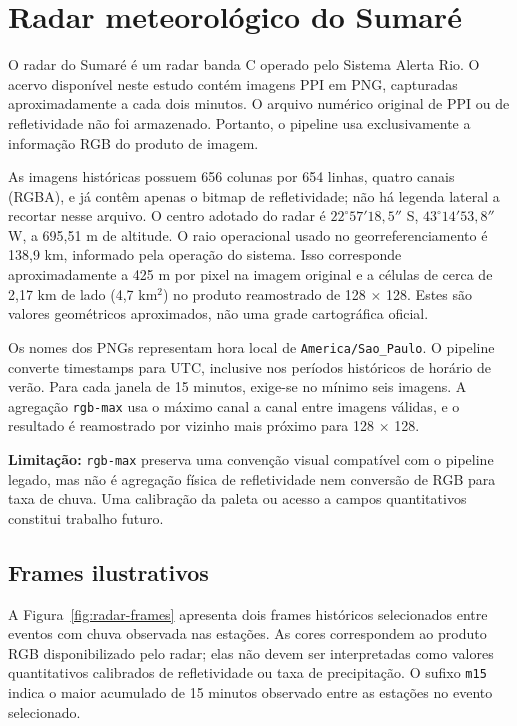 \documentclass[11pt,a4paper]{article}
\begin{document}
\section{Radar meteorológico do Sumaré}
O radar do Sumaré é um radar banda C operado pelo Sistema Alerta Rio. O acervo disponível neste estudo contém imagens PPI em PNG, capturadas aproximadamente a cada dois minutos. O arquivo numérico original de PPI ou de refletividade não foi armazenado. Portanto, o pipeline usa exclusivamente a informação RGB do produto de imagem.

As imagens históricas possuem 656 colunas por 654 linhas, quatro canais (RGBA), e já contêm apenas o bitmap de refletividade; não há legenda lateral a recortar nesse arquivo. O centro adotado do radar é $22^\circ57'18{,}5''$ S, $43^\circ14'53{,}8''$ W, a 695,51 m de altitude. O raio operacional usado no georreferenciamento é 138,9 km, informado pela operação do sistema. Isso corresponde aproximadamente a 425 m por pixel na imagem original e a células de cerca de 2,17 km de lado (4,7 km$^2$) no produto reamostrado de 128 $\times$ 128. Estes são valores geométricos aproximados, não uma grade cartográfica oficial.

Os nomes dos PNGs representam hora local de \texttt{America/Sao\_Paulo}. O pipeline converte timestamps para UTC, inclusive nos períodos históricos de horário de verão. Para cada janela de 15 minutos, exige-se no mínimo seis imagens. A agregação \texttt{rgb-max} usa o máximo canal a canal entre imagens válidas, e o resultado é reamostrado por vizinho mais próximo para 128 $\times$ 128.

\textbf{Limitação:} \texttt{rgb-max} preserva uma convenção visual compatível com o pipeline legado, mas não é agregação física de refletividade nem conversão de RGB para taxa de chuva. Uma calibração da paleta ou acesso a campos quantitativos constitui trabalho futuro.

\subsection{Frames ilustrativos}
A Figura~\ref{fig:radar-frames} apresenta dois frames históricos selecionados entre eventos com chuva observada nas estações. As cores correspondem ao produto RGB disponibilizado pelo radar; elas não devem ser interpretadas como valores quantitativos calibrados de refletividade ou taxa de precipitação. O sufixo \texttt{m15} indica o maior acumulado de 15 minutos observado entre as estações no evento selecionado.
\end{document}
